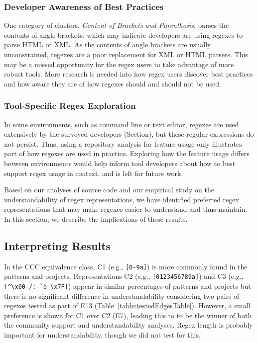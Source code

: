 \subsubsection{Developer Awareness of Best Practices}
One category of clusters, \emph{Content of Brackets and Parenthesis}, parses the contents of angle brackets, which may indicate developers are using regexes to parse HTML or XML.  As the contents of angle brackets are usually unconstrained, regexes are a poor replacement for XML or HTML parsers.  This may be a missed opportunity for the regex users to take advantage of more robust tools. More research is needed into how regex users discover best practices and how aware they are of how regexes should and should not be used.

\subsubsection{Tool-Specific Regex Exploration}
In some environments, such as command line or text editor, regexes are used extensively by the surveyed developers (Section), but these regular expressions do not persist. Thus, using a repository analysis for feature usage only illustrates part of how regexes are used in practice. Exploring how the feature usage differs between environments would help inform tool developers about how to best support regex usage in context, and is left for future work.

Based on our analyses of source code and our empirical study on the understandability of regex representations, we have identified preferred regex representations that may make regexes easier to understand and thus maintain. In this section, we describe the implications of these results.

\subsection{Interpreting Results}
In the CCC equivalence class, C1 (e.g., \verb![0-9a]!) is more commonly found in the patterns and projects.  Representations C2 (e.g., \verb![0123456789a]!) and C3 (e.g., \verb![^\x00-/:-`b-\x7F]!) appear in similar percentages of patterns and projects but there is no significant difference in understandability considering two pairs of regexes tested as part of E13 (Table~\ref{table:testedEdgesTable}). However, a small preference is shown for C1 over C2 (E7), leading this to to be the winner of both the community support and understandability analyses.    Regex length is probably important for understandability, though we did not test for this.

